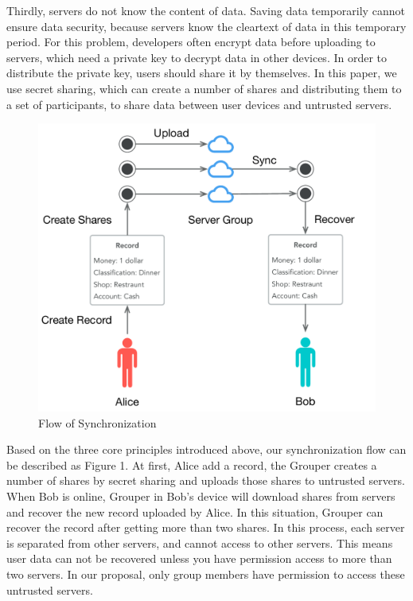 \documentclass[twocolumn,10pt]{article}
\begin{document}
Thirdly, servers do not know the content of data. Saving data temporarily cannot ensure data security, because servers know the cleartext of data in this temporary period. For this problem, developers often encrypt data before uploading to servers, which need a private key to decrypt data in other devices. In order to distribute the private key, users should share it by themselves. In this paper, we use secret sharing, which can create a number of shares and distributing them to a set of participants\cite{smith2013layered}, to share data between user devices and untrusted servers.

\begin{figure}[t]
\centering
\includegraphics[scale=0.4]{sync_flow}
\caption{Flow of Synchronization}
\end{figure}
Based on the three core principles introduced above, our synchronization flow can be described as Figure 1. At first, Alice add a record, the Grouper creates a number of shares by secret sharing and uploads those shares to untrusted servers. When Bob is online, Grouper in Bob's device will download shares from servers and recover the new record uploaded by Alice. In this situation, Grouper can recover the record after getting more than two shares. In this process, each server is separated from other servers, and cannot access to other servers. This means user data can not be recovered unless you have permission access to more than two servers. In our proposal, only group members have permission to access these  untrusted servers.
\end{document}
